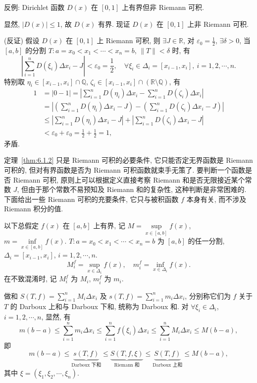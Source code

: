 反例: Dirichlet 函数 $D(x)$ 在 $[0,1]$ 上有界但非 Riemann 可积.

显然, $|D(x)|\leqslant 1$, 故 $D(x)$ 有界. 现证 $D(x)$ 在 $[0,1]$ 上非 Riemann 可积.

(反证) 假设 $D(x)$ 在 $[0,1]$ 上 Riemann 可积, 则 $\exists J\in\mathbb{R}$, 对 $\varepsilon_{0}=\frac{1}{2}$, $\exists\delta>0$, 当 $[a,b]$ 的分割 $T:a=x_{0}<x_{1}<\cdots<x_{n}=b$, $\|T\|<\delta$ 时, 有
\[
\left|\sum_{i=1}^{n}D(\xi_{i})\Delta x_{i}-J\right|<\varepsilon_{0}=\frac{1}{2},\quad\forall\xi_{i}\in\Delta_{i}=[x_{i-1},x_{i}],\ i=1,2,\cdots,n.
\]
特别取 $\eta_{i}\in[x_{i-1},x_{i}]\cap\mathbb{Q}$, $\zeta_{i}\in[x_{i-1},x_{i}]\cap(\mathbb{R}\setminus\mathbb{Q})$, 有
\begin{align*}
1&=|0-1|=\left|\sum_{i=1}^{n}D(\eta_{i})\Delta x_{i}-\sum_{i=1}^{n}D(\zeta_{i})\Delta x_{i}\right|\\
&=\left|\left(\sum_{i=1}^{n}D(\eta_{i})\Delta x_{i}-J\right)-\left(\sum_{i=1}^{n}D(\zeta_{i})\Delta x_{i}-J\right)\right|\\
&\leqslant\left|\sum_{i=1}^{n}D(\eta_{i})\Delta x_{i}-J\right|+\left|\sum_{i=1}^{n}D(\zeta_{i})\Delta x_{i}-J\right|\\
&<\varepsilon_{0}+\varepsilon_{0}=\frac{1}{2}+\frac{1}{2}=1,
\end{align*}
矛盾.

定理~\ref{thm:6.1.2} 只是 Riemann 可积的必要条件, 它只能否定无界函数是 Riemann 可积的, 但对有界函数是否为 Riemann 可积函数就束手无策了. 要判断一个函数是否 Riemann 可积, 原则上可以根据定义直接考察 Riemann 和是否无限接近某个常数 $J$, 但由于那个常数不易预知及 Riemann 和的复杂性, 这种判断是非常困难的. 下面给出一些 Riemann 可积的充要条件, 它只与被积函数 $f$ 本身有关, 而不涉及 Riemann 积分的值.

以下总假定 $f(x)$ 在 $[a,b]$ 上有界, 记 $M=\sup\limits_{x\in[a,b]}f(x)$, $m=\inf\limits_{x\in[a,b]}f(x)$. $T:a=x_{0}<x_{1}<\cdots<x_{n}=b$ 为 $[a,b]$ 的任一分割, $\Delta_{i}=[x_{i-1},x_{i}]$, $i=1,2,\cdots,n$.
\[
M_{i}^{f}=\sup_{x\in\Delta_{i}}f(x),\quad m_{i}^{f}=\inf_{x\in\Delta_{i}}f(x).
\]
在不致混淆时, 记 $M_{i}^{f}$ 为 $M_{i}$, $m_{i}^{f}$ 为 $m_{i}$.

做和 $S(T,f)=\sum\limits_{i=1}^{n}M_{i}\Delta x_{i}$ 及 $s(T,f)=\sum\limits_{i=1}^{n}m_{i}\Delta x_{i}$, 分别称它们为 $f$ 关于 $T$ 的 Darboux 上和与 Darboux 下和, 统称为 Darboux 和. 对 $\forall\xi_{i}\in\Delta_{i}$, $i=1,2,\cdots,n$, 显然, 有
\[
m(b-a)\leqslant\sum_{i=1}^{n}m_{i}\Delta x_{i}\leqslant\sum_{i=1}^{n}f(\xi_{i})\Delta x_{i}\leqslant\sum_{i=1}^{n}M_{i}\Delta x_{i}\leqslant M(b-a),
\]
即
\[
m(b-a)\leqslant\underbrace{s(T,f)}_{\text{Darboux 下和}}\leqslant\underbrace{S(T,f,\xi)}_{\text{Riemann 和}}\leqslant\underbrace{S(T,f)}_{\text{Darboux 上和}}\leqslant M(b-a),
\]
其中 $\xi=(\xi_{1},\xi_{2},\cdots,\xi_{n})$.

